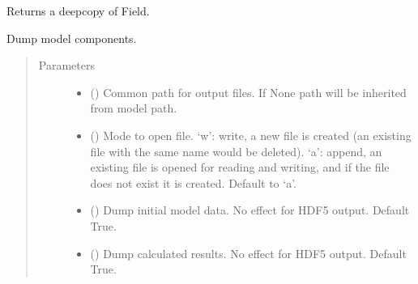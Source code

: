 \documentclass[letterpaper,10pt,english]{sphinxmanual}
\begin{document}
\begin{fulllineitems}
\begin{fulllineitems}
\label{\detokenize{api/field:geology.src.Field.copy}}
Returns a deepcopy of Field.

\end{fulllineitems}


\begin{fulllineitems}
\label{\detokenize{api/field:geology.src.Field.dump}}
Dump model components.
\begin{quote}\begin{description}
\item[{Parameters}] \leavevmode\begin{itemize}
\item {} 
 () \textendash{} Common path for output files. If None path will be inherited from model path.

\item {} 
 () \textendash{} Mode to open file.
‘w’: write, a new file is created (an existing file with
the same name would be deleted).
‘a’: append, an existing file is opened for reading and writing,
and if the file does not exist it is created.
Default to ‘a’.

\item {} 
 () \textendash{} Dump initial model data. No effect for HDF5 output. Default True.

\item {} 
 () \textendash{} Dump calculated results. No effect for HDF5 output. Default True.


\end{itemize}
\end{description}
\end{quote}
\end{fulllineitems}
\end{fulllineitems}
\end{document}
